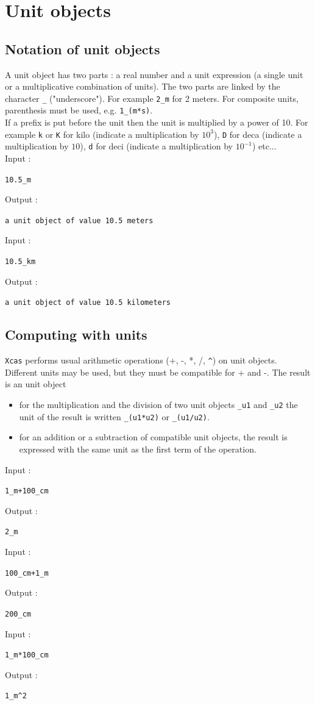 \documentclass[a4paper,11pt]{book}
\begin{document}
\section{Unit objects}
\subsection{Notation of unit objects}
A unit object has two parts : a real number and a unit expression (a single 
unit or a multiplicative combination of units). The two parts are linked by the 
character {\tt \_} ("underscore"). For example {\tt 2\_m} for 2 meters.
For composite units, parenthesis must be used, e.g. {\tt 1\_(m*s)}.\\
If a prefix is put before the unit then the unit is multiplied by a power of
10. For example {\tt k} or {\tt K} for kilo (indicate a multiplication by 
$10^3$), {\tt D} for  deca (indicate a multiplication by $10$), {\tt d} for
deci (indicate a multiplication by $10^{-1}$) etc...\\ 
Input :
\begin{center}{\tt 10.5\_m}\end{center}
Output :
\begin{center}{\tt a unit object of value 10.5 meters}\end{center}
Input :
\begin{center}{\tt 10.5\_km}\end{center}
Output :
\begin{center}{\tt a unit object of value 10.5 kilometers}\end{center}

\subsection{Computing with units}
{\tt Xcas} performs usual arithmetic operations (+, -, *, /, \verb|^|) on
unit objects. Different units may be used, but they must be 
compatible for + and -. The result is an unit object
\begin{itemize}
\item for the 
multiplication and the division of two unit objects 
{\tt \_u1} and {\tt \_u2} the unit of the result is written 
{\tt \_(u1*u2)} or {\tt \_(u1/u2)}. 
\item  for an addition or a subtraction of compatible unit objects, 
the result is expressed with the same unit as the first term of the operation.
\end{itemize}
Input :
\begin{center}{\tt 1\_m+100\_cm}\end{center}
Output :
\begin{center}{\tt 2\_m}\end{center}
Input :
\begin{center}{\tt 100\_cm+1\_m}\end{center}
Output :
\begin{center}{\tt 200\_cm}\end{center}
Input :
\begin{center}{\tt 1\_m*100\_cm}\end{center}
Output :
\begin{center}{\tt 1\_m\verb|^|2}\end{center}
\end{document}
